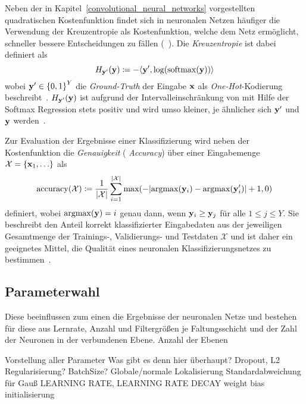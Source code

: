 Neben der in Kapitel~\ref{convolutional_neural_networks} vorgestellten quadratischen Kostenfunktion findet sich in neuronalen Netzen häufiger die Verwendung der Kreuzentropie als Kostenfunktion, welche dem Netz ermöglicht, schneller bessere Entscheidungen zu fällen (\vgl{}~\cite{Nielsen}).
Die \emph{Kreuzentropie} ist dabei definiert als
\begin{equation*}
  H_{\ve{y}^{\prime}}\left(\ve{y}\right) \coloneqq - \left\langle \ve{y}^{\prime}, \log\left(\mathrm{softmax}\left(\ve{y}\right)\right)\right\rangle
\end{equation*}
wobei $\ve{y}^{\prime} \in {\left\{ 0, 1 \right\}}^Y$ die \emph{Ground-Truth} der Eingabe $\mathbf{x}$ als \emph{One-Hot}-Kodierung beschreibt~\cite{tensorflow, Nielsen}.
$H_{\ve{y}^{\prime}}\left(\ve{y}\right)$ ist aufgrund der Intervalleinschränkung von  mit Hilfe der Softmax Regression stets positiv und wird umso kleiner, je ähnlicher sich $\mathbf{y}^{\prime}$ und $\mathbf{y}$ werden~\cite{Nielsen}.

Zur Evaluation der Ergebnisse einer Klassifizierung wird neben der Kostenfunktion die \emph{Genauigkeit} (\engl{} \emph{Accuracy}) über einer Eingabemenge $\mathcal{X} = \left\{\ve{x}_1, \ldots \right\}$ als
\begin{equation*}
  \mathrm{accuracy}\left(\mathcal{X}\right) \coloneqq \frac{1}{\left|\mathcal{X}\right|}\sum_{i = 1}^{\left|\mathcal{X}\right|}  \max \left( - \left| \mathrm{argmax}\left(\ve{y}_i\right) - \mathrm{argmax}\left(\ve{y}^{\prime}_i\right) \right| + 1, 0 \right)
\end{equation*}
definiert, wobei $\mathrm{argmax}\left(\ve{y}\right) = i$ genau dann, wenn $\mathbf{y}_i \geq \mathbf{y}_j$ für alle $1 \leq j \leq Y$.
Sie beschreibt den Anteil korrekt klassifizierter Eingabedaten aus der jeweiligen Gesamtmenge der Trainings-, Validierungs- und Testdaten $\mathcal{X}$ und ist daher ein geeignetes Mittel, die Qualität eines neuronalen Klassifizierungsnetzes zu bestimmen~\cite{Nielsen}.

\subsection{Parameterwahl}
\label{parameterwahl}

Diese beeinflussen zum einen die Ergebnisse der neuronalen Netze und bestehen für diese aus Lernrate, Anzahl und Filtergrößen je Faltungsschicht und der Zahl der Neuronen in der verbundenen Ebene.
Anzahl der Ebenen

Vorstellung aller Parameter
Was gibt es denn hier überhaupt?
Dropout, L2 Regularisierung?
BatchSize?
Globale/normale Lokalisierung
Standardabweichung für Gauß
LEARNING RATE, LEARNING RATE DECAY
weight bias initialisierung

